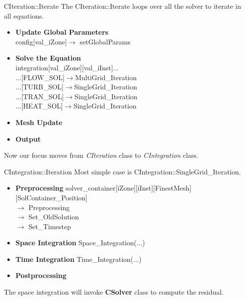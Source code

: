 \begin{frame}{CIteration::Iterate}
The CIteration::Iterate loops over all the solver to iterate in all equations.
\begin{itemize}
    \item \textbf{Update Global Parameters}\\
    config[val\_iZone]$\longrightarrow$ setGlobalParams
    \item \textbf{Solve the Equation}\\
    integration[val\_iZone][val\_iInst]...\\
    ...[FLOW\_SOL]$\longrightarrow$MultiGrid\_Iteration\\
    ...[TURB\_SOL]$\longrightarrow$SingleGrid\_Iteration\\
    ...[TRAN\_SOL]$\longrightarrow$SingleGrid\_Iteration\\
    ...[HEAT\_SOL]$\longrightarrow$SingleGrid\_Iteration
    \item \textbf{Mesh Update}
    \item \textbf{Output}
    
\end{itemize}
Now our focus moves from \emph{CIteration} class to \emph{CIntegration} class.
\end{frame}

\begin{frame}{CIntegration::Iteration}
Most simple case is CIntegration::SingleGrid\_Iteration.

\begin{itemize}
    \item \textbf{Preprocessing}
    solver\_container[iZone][iInst][FinestMesh][SolContainer\_Position]\\$\longrightarrow$ Preprocessing\\$\longrightarrow$ Set\_OldSolution \\$\longrightarrow$ Set\_Timestep
    \item \textbf{Space Integration}
    Space\_Integration(...)
    \item \textbf{Time Integration}
    Time\_Integration(...)
    \item \textbf{Postprocessing}
\end{itemize}

The space integration will invoke \textbf{CSolver} class to compute the residual.
\end{frame}

